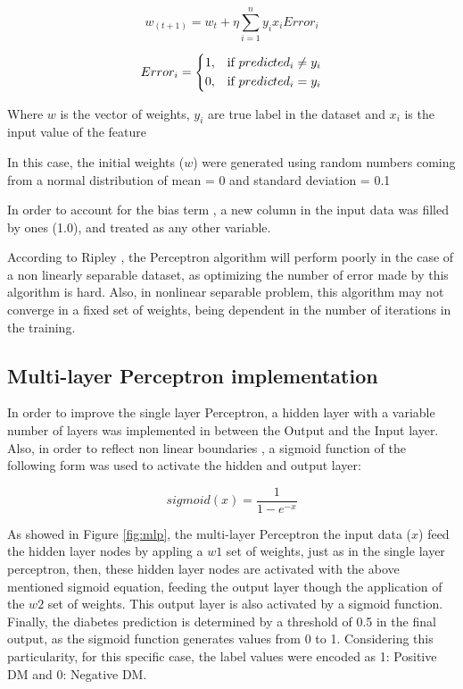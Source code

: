 \documentclass[10pt,twocolumn,letterpaper]{article}
\begin{document}
\begin{equation}
	w_(t+1) = w_t + \eta \sum_{i=1}^{n} y_i x_i Error_i
\end{equation}

\begin{equation}
Error_i= 
\begin{dcases}
1,& \text{if } predicted_i \neq y_i\\
0,& \text{if } predicted_i = y_i\\
\end{dcases}
\end{equation}

Where $w$ is the vector of weights, $y_i$ are true label in the dataset and $x_i$ is the input value of the feature

In this case, the initial weights ($w$) were generated using random numbers coming from a normal distribution of mean = 0 and standard deviation = 0.1

In order to account for the bias term \cite{Vapnik1995}, a new column in the input data was filled by ones (1.0), and treated as any other variable.

According to Ripley \cite{Ripley1996}, the Perceptron algorithm will perform poorly in the case of a non linearly separable dataset, as optimizing the number of error made by this algorithm is hard. Also, in nonlinear separable problem, this algorithm may not converge in a fixed set of weights, being dependent in the number of iterations in the training.  

\subsection{Multi-layer Perceptron implementation}

In order to improve the single layer Perceptron, a hidden layer with a variable number of layers  was implemented in between the Output and the Input layer. Also, in order to reflect non linear boundaries \cite{Vapnik1995}, a sigmoid function of the following form was used to activate the hidden and output layer:

\begin{equation}
sigmoid(x) = \frac{1}{1-e^{-x}}
\end{equation}

As showed in Figure \ref{fig:mlp}, the multi-layer Perceptron the input data ($x$) feed the hidden layer nodes by appling a $w1$ set of weights, just as in the single layer perceptron, then, these hidden layer nodes are activated with the above mentioned sigmoid equation, feeding the output layer though the application of the $w2$ set of weights. This output layer is also activated by a sigmoid function. Finally, the diabetes prediction is determined by a threshold of 0.5 in the final output, as the sigmoid function generates values from 0 to 1. Considering this particularity, for this specific case, the label values were encoded as 1: Positive DM and 0: Negative DM.
\end{document}
